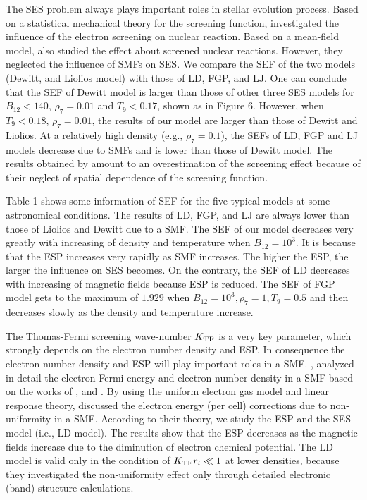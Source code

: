 \documentclass[manuscript]{aastex}
\begin{document}
The SES problem always plays important roles in stellar evolution
process. Based on a statistical mechanical theory for the screening
function, \citet{Dewitt76} investigated the influence of the
electron screening on nuclear reaction. Based on a mean-field model,
\citet{ Liolios00} also studied the effect about screened nuclear
reactions. However, they neglected the influence of SMFs on SES. We
compare the SEF of the two models (Dewitt, and Liolios model) with
those of LD, FGP, and LJ. One can conclude that the SEF of Dewitt
model is larger than those of other three SES models for
$B_{12}<140$, $\rho_7=0.01$ and $T_9<0.17$, shown as in Figure 6.
However, when $T_9<0.18$, $\rho_7=0.01$, the results of our model
are larger than those of Dewitt and Liolios. At a relatively high
density (e.g., $\rho_7=0.1$), the SEFs of LD, FGP and LJ models
decrease due to SMFs and is lower than those of Dewitt model. The
results obtained by \cite{Dewitt76} amount to an overestimation of
the screening effect because of their neglect of spatial dependence
of the screening function.

Table 1 shows some information of SEF for the five typical models at
some astronomical conditions. The results of LD, FGP, and LJ are
always lower than those of Liolios and Dewitt due to a SMF. The SEF
of our model decreases very greatly with increasing of density and
temperature when $B_{12}=10^3$. It is because that the ESP increases
very rapidly as SMF increases. The higher the ESP, the larger the
influence on SES becomes. On the contrary, the SEF of LD decreases
with increasing of magnetic fields because ESP is reduced. The SEF
of FGP model gets to the maximum of $1.929$ when $B_{12}=10^3,
\rho_7=1, T_9=0.5$ and then decreases slowly as the density and
temperature increase.


The Thomas-Fermi screening wave-number $K_{\rm{TF}}$ is a very key
parameter, which strongly depends on the electron number density and
ESP. In consequence the electron number density and ESP will play
important roles in a SMF. \citet{Lai91}, analyzed in detail the
electron Fermi energy and electron number density in a SMF based on
the works of \citet{Canuto68, Canuto71, Kubo65}, and
\citet{Pathria03}. By using the uniform electron gas model and
linear response theory, \citet{Lai01}discussed the electron energy
(per cell) corrections due to non-uniformity in a SMF. According to
their theory, we study the ESP and the SES model (i.e., LD model).
The results show that the ESP decreases as the magnetic fields
increase due to the diminution of electron chemical potential. The
LD model is valid only in the condition of $K_{\rm{TF}} r_i\ll1$ at
lower densities, because they investigated the non-uniformity effect
only through detailed electronic (band) structure calculations.
\end{document}
